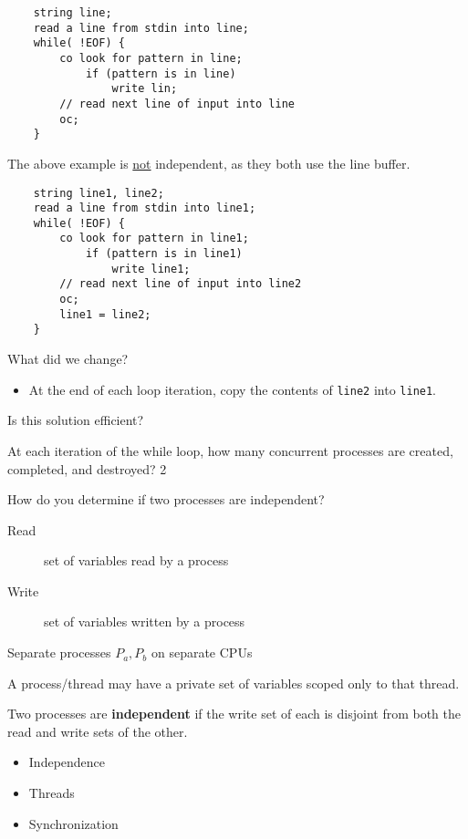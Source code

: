 \documentclass{article}
\begin{document}
\begin{verbatim}
    string line;
    read a line from stdin into line;
    while( !EOF) {
        co look for pattern in line;
            if (pattern is in line)
                write lin;
        // read next line of input into line
        oc;
    }
\end{verbatim}

The above example is \underline{not} independent, as they both use the line buffer.

\begin{verbatim}
    string line1, line2;
    read a line from stdin into line1;
    while( !EOF) {
        co look for pattern in line1;
            if (pattern is in line1)
                write line1;
        // read next line of input into line2
        oc;
        line1 = line2;
    }
\end{verbatim}
What did we change?
\begin{itemize}
    \item At the end of each loop iteration, copy the contents of \texttt{line2} into \texttt{line1}.
\end{itemize}

Is this solution efficient?

At each iteration of the while loop, how many concurrent processes are created, completed, and destroyed?
2

How do you determine if two processes are independent?

\begin{description}
    \item[Read] set of variables read by a process
    \item[Write] set of variables written by a process
\end{description}

Separate processes \(P_a, P_b\) on separate CPUs

A process/thread may have a private set of variables scoped only to that thread.

Two processes are \textbf{independent} if the write set of each is disjoint from
both the read and write sets of the other.

\begin{itemize}
    \item Independence
    \item Threads
    \item Synchronization
\end{itemize}
\end{document}
